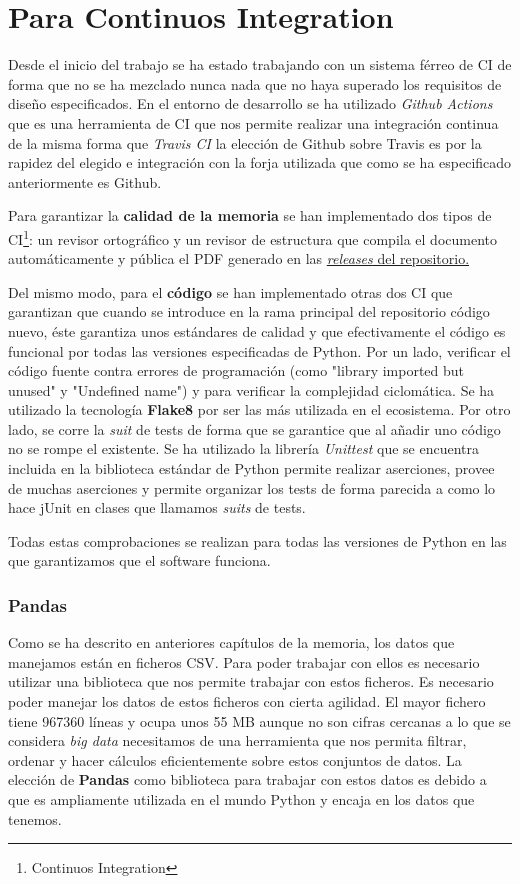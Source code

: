 \section{Para Continuos Integration}
Desde el inicio del trabajo se ha estado trabajando con un sistema férreo de CI de forma que no se ha mezclado nunca nada que no haya superado los requisitos de diseño especificados. En el entorno de desarrollo se ha utilizado \textit{Github Actions} que es una herramienta de CI que nos permite realizar una integración continua de la misma forma que \textit{Travis CI} la elección de Github sobre Travis es por la rapidez del elegido e integración con la forja utilizada que como se ha especificado anteriormente es Github.

Para garantizar la \textbf{calidad de la memoria} se han implementado dos tipos de CI\footnote{Continuos Integration}: un revisor ortográfico y un revisor de estructura que compila el documento automáticamente y pública el PDF generado en las \href{https://github.com/pablojjimenez/TFG/releases}{\textit{releases} del repositorio.}

Del mismo modo, para el \textbf{código} se han implementado otras dos CI que garantizan que cuando se introduce en la rama principal del repositorio código nuevo, éste garantiza unos estándares de calidad y que efectivamente el código es funcional por todas las versiones especificadas de Python. Por un lado, verificar el código fuente contra errores de programación (como "library imported but unused" y "Undefined name") y para verificar la complejidad ciclomática. Se ha utilizado la tecnología \cite{flake}\textbf{Flake8} por ser las más utilizada en el ecosistema.
Por otro lado, se corre la \textit{suit} de tests de forma que se garantice que al añadir uno código no se rompe el existente. Se ha utilizado la librería \textit{Unittest} que se encuentra incluida en la biblioteca estándar de Python permite realizar aserciones, provee de muchas aserciones y permite organizar los tests de forma parecida a como lo hace jUnit en clases que llamamos \textit{suits} de tests.

Todas estas comprobaciones se realizan para todas las versiones de Python en las que garantizamos que el software funciona.

\subsubsection{Pandas}
Como se ha descrito en anteriores capítulos de la memoria, los datos que manejamos están en ficheros CSV. Para poder trabajar con ellos es necesario utilizar una biblioteca que nos permite trabajar con estos ficheros. Es necesario poder manejar los datos de estos ficheros con cierta agilidad. El mayor fichero tiene 967360 líneas y ocupa unos 55 MB aunque no son cifras cercanas a lo que se considera \textit{big data} necesitamos de una herramienta que nos permita filtrar, ordenar y hacer cálculos eficientemente sobre estos conjuntos de datos. La elección de \textbf{Pandas} como biblioteca para trabajar con estos datos es debido a que es ampliamente utilizada en el mundo Python y encaja en los datos que tenemos.


